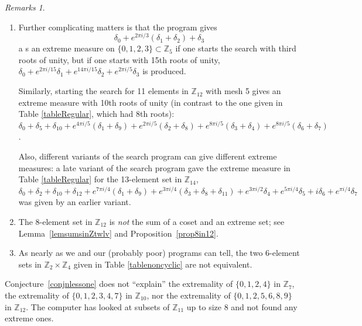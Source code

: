 \documentclass[letter,11pt]{amsart}
\numberwithin{theorem}{section}
\theoremstyle{remark}
\newtheorem{rems}[theorem]{Remarks}
\numberwithin{equation}{section}
\newcommand{\conjref}[1]{Conjecture~\ref{#1}}
\newcommand{\lemref}[1]{Lemma~\ref{#1}}
\newcommand{\propref}[1]{Proposition~\ref{#1}}
\newcommand{\pii}{\pi i}
\newcommand\Zp[2]{\texttt{$\mathbb Z_{#1}^{\	#2}$}}
\begin{document}
\begin{rems}
\begin{enumerate}
Those sort of examples will complicate
 the process of finding all extreme sets of composite cardinality.
 
 \item Further complicating matters is that the program gives 
 \[ \delta_0+e^{2\pi i/3}(\delta_1+\delta_2)+\delta_3\] a
 s an extreme measure on $\{0,1,2,3\}\subset\Zp5{} $ if one starts  the search
 with third roots of unity, but if one starts with 15th roots of unity, $\delta_{0}+e^{2\pii/15}\delta_{1}+e^{14\pii/15}\delta_{2}+e^{2\pii/5}\delta_{3}
$ is produced.

Similarly, starting the search for 11 elements in \Zp{12}{} with mesh 5 gives an extreme measure with
10th roots of unity (in contrast to the one given in 
Table \ref{tableRegular}, which had 8th roots): 
$ \delta_{0}+\delta_{5}+\delta_{10}
+e^{4\pii/5}(\delta_{1}+\delta_{9})
+e^{2\pii/5}(\delta_{2} +\delta_{8}) 
+e^{8\pii/5}(\delta_{3}+\delta_{4}
)+e^{8\pii/5}(\delta_{6}+\delta_{7})$.

Also, different variants of the search program can give different extreme measures: a late
variant of the search program gave the
extreme measure in Table \ref{tableRegular} for the 13-element set in \Zp{14}{}, $\delta_{0} +   \delta_{2} +     \delta_{10}+  \delta_{12} 
+   e^{ 7\pi i  / 4}(\delta_{1}  +   \delta_{9} )
  +   e^{ 3\pi i  / 4}(\delta_{3}  +   \delta_{8} +   \delta_{11} )
  +   e^{ 3\pi i  / 2}\delta_{4}  +   e^{ 5\pi i  / 4}\delta_{5} 
+   i\delta_{6}  +  e^{ \pi i  / 4}\delta_{7}$
was given by an earlier variant.

\item The 8-element set in \Zp{12}{} is \emph{not} the sum of a coset and an extreme set; see \lemref{lemsumsinZtwlv}
and \propref{prop8in12}.

\item As nearly as we and our (probably poor) programs can tell, the
two 6-element sets in $\Zp2{} \times \Zp{4}{}$ given in Table \ref{tablenoncyclic} are not equivalent.
\end{enumerate}
\end{rems}


\conjref{conjnlessone} does not ``explain'' the extremality of $\{0,1,2,4\}$ in \Zp{7}{}, the extremality of $\{0,1,2,3,4,7\}$ in \Zp{10}{}, nor the extremality of $\{0,1,2,5,6,8,9\}$ in \Zp{12}{}. The computer has looked at subsets of \Zp{11}{} up to size 8 and not found any extreme ones. 
\end{document}
